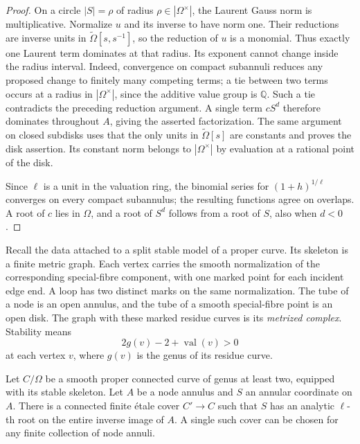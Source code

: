 \begin{proof}
On a circle $|S|=\rho$ of radius $\rho\in|\Omega^\times|$, the Laurent
Gauss norm is multiplicative.  Normalize $u$ and its inverse to have norm
one.  Their reductions are inverse units in
$\widetilde\Omega[s,s^{-1}]$, so the reduction of $u$ is a monomial.
Thus exactly one Laurent term dominates at that radius.  Its exponent
cannot change inside the radius interval.  Indeed, convergence on compact
subannuli reduces any proposed change to finitely many competing terms;
a tie between two terms occurs at a radius in $|\Omega^\times|$, since
the additive value group is $\mathbb Q$.  Such a tie contradicts the
preceding reduction argument.  A single term $cS^d$ therefore dominates
throughout $A$, giving the asserted factorization.  The same argument on
closed subdisks uses that the only units in $\widetilde\Omega[s]$ are
constants and proves the disk assertion.  Its constant norm belongs to
$|\Omega^\times|$ by evaluation at a rational point of the disk.

Since $\ell$ is a unit in the valuation ring, the binomial series for
$(1+h)^{1/\ell}$ converges on every compact subannulus; the resulting
functions agree on overlaps.  A root of $c$ lies in $\Omega$, and a root
of $S^d$ follows from a root of $S$, also when $d<0$.
\end{proof}

Recall the data attached to a split stable model of a proper curve.
Its skeleton is a finite metric graph.  Each vertex carries the smooth
normalization of the corresponding special-fibre component, with one
marked point for each incident edge end.  A loop has two distinct marks
on the same normalization.  The tube of a node is an open annulus,
and the tube of a smooth special-fibre point is an open disk.
The graph with these marked residue curves is its \emph{metrized complex}.
Stability means
\[
 2g(v)-2+\operatorname{val}(v)>0
\]
at each vertex $v$, where $g(v)$ is the genus of its residue curve.

\begin{lemma}\label{lem:stable-edge-root}
Let $C/\Omega$ be a smooth proper connected curve of genus at least two,
equipped with its stable skeleton.  Let $A$ be a node annulus and $S$
an annular coordinate on $A$.  There is a connected finite \'etale cover
$C'\to C$ such that $S$ has an analytic $\ell$-th root on the entire
inverse image of $A$.  A single such cover can be chosen for any finite
collection of node annuli.
\end{lemma}

